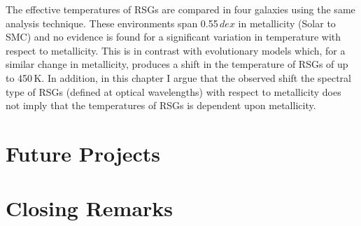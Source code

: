 The effective temperatures of RSGs are compared in four galaxies using the same analysis technique.
These environments span 0.55\,$dex$ in metallicity (Solar to SMC) and no evidence is found for a significant variation in temperature with respect to metallicity.
This is in contrast with evolutionary models which, for a  similar change in metallicity, produces a shift in the temperature of RSGs of up to 450\,K.
In addition, in this chapter I argue that the observed shift the spectral type of RSGs (defined at optical wavelengths) with respect to metallicity does not imply that the temperatures of RSGs is dependent upon metallicity.




\section{Future Projects} %
\label{sec:future_projects}


\section{Closing Remarks} %
\label{sec:closing_remarks}

